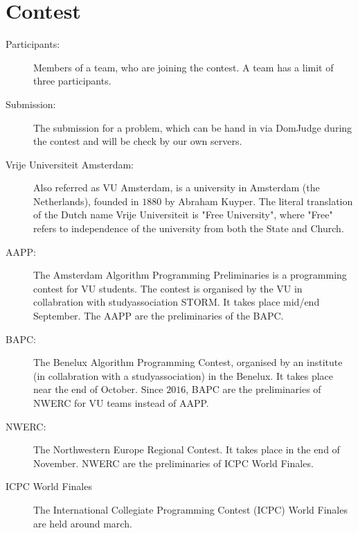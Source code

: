 \section{Contest}
\begin{description}
\item[Participants:]
Members of a team, who are joining the contest. A team has a limit of three participants.

\item[Submission:]
The submission for a problem, which can be hand in via DomJudge during the contest and will be check by our own servers.

\item[Vrije Universiteit Amsterdam:] Also referred as VU Amsterdam, is a university in Amsterdam (the Netherlands), founded in $1880$ by Abraham Kuyper. The literal translation of the Dutch name Vrije Universiteit is "Free University", where "Free" refers to independence of the university from both the State and Church.

\item[AAPP:]
The Amsterdam Algorithm Programming Preliminaries is a programming contest for VU students. The contest is organised by the VU in collabration with studyassociation STORM. It takes place mid/end September. The AAPP are the preliminaries of the BAPC.

\item[BAPC:]
The Benelux Algorithm Programming Contest, organised by an institute (in collabration with a studyassociation) in the Benelux. It takes place near the end of October. Since $2016$, BAPC are the preliminaries of NWERC for VU teams instead of AAPP.

\item[NWERC:]
The Northwestern Europe Regional Contest. It takes place in the end of November. NWERC are the preliminaries of ICPC World Finales.

\item[ICPC World Finales]
The International Collegiate Programming Contest (ICPC) World Finales are held around march.
\end{description}

